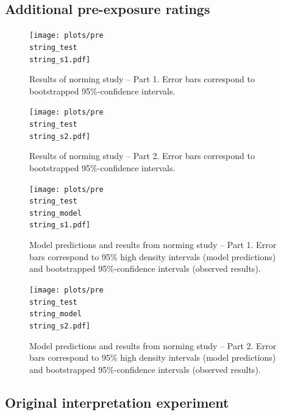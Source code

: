 \documentclass[lucida,biblatex]{sp} %
\begin{document}
\subsection*{Additional pre-exposure ratings}

\begin{figure}
\texttt{[image: plots/pre\\string\_test\\string\_s1.pdf]}
\caption{Results of norming study -- Part 1. Error bars correspond to bootstrapped 95\%-confidence intervals. \label{fig:norming-results-1}}
\end{figure}

\begin{figure}
\texttt{[image: plots/pre\\string\_test\\string\_s2.pdf]}
\caption{Results of norming study -- Part 2. Error bars correspond to bootstrapped 95\%-confidence intervals. \label{fig:norming-results-2}}

\end{figure}

\begin{figure}
\texttt{[image: plots/pre\\string\_test\\string\_model\\string\_s1.pdf]}
\caption{Model predictions and results from norming study -- Part 1. Error bars correspond to 95\% high density intervals (model predictions) and bootstrapped 95\%-confidence intervals (observed results). \label{fig:norming-results-model-1}}

\end{figure}

\begin{figure}
\texttt{[image: plots/pre\\string\_test\\string\_model\\string\_s2.pdf]}
\caption{Model predictions and results from norming study -- Part 2. Error bars correspond to 95\% high density intervals (model predictions) and bootstrapped 95\%-confidence intervals (observed results). \label{fig:norming-results-model-2}}

\end{figure}

\subsection*{Original interpretation experiment}
\end{document}
